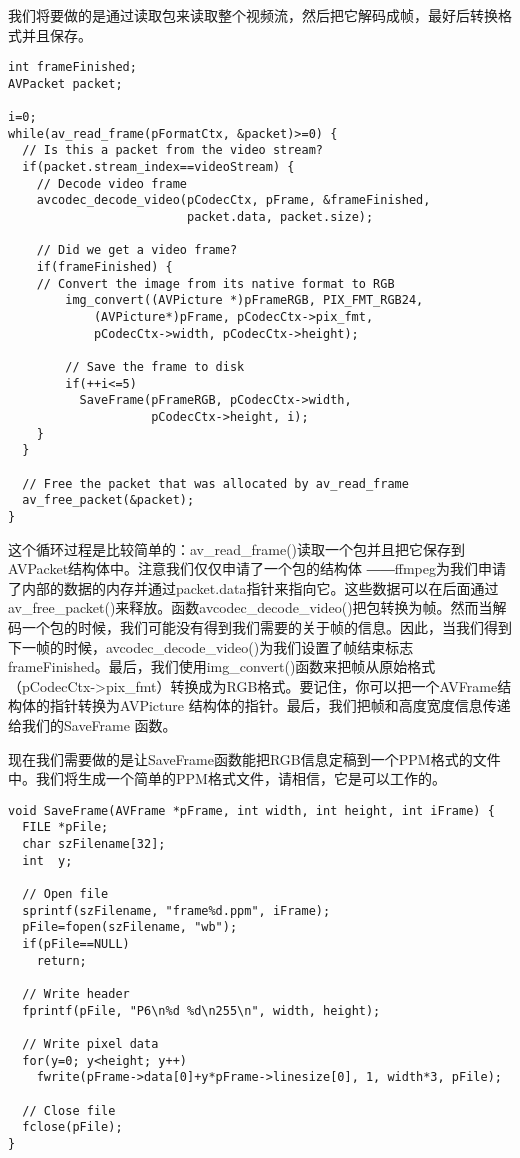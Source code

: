 我们将要做的是通过读取包来读取整个视频流，然后把它解码成帧，最好后转换格式并且保存。
\begin{lstlisting}
int frameFinished;
AVPacket packet;

i=0;
while(av_read_frame(pFormatCtx, &packet)>=0) {
  // Is this a packet from the video stream?
  if(packet.stream_index==videoStream) {
    // Decode video frame
    avcodec_decode_video(pCodecCtx, pFrame, &frameFinished,
                         packet.data, packet.size);

    // Did we get a video frame?
    if(frameFinished) {
    // Convert the image from its native format to RGB
        img_convert((AVPicture *)pFrameRGB, PIX_FMT_RGB24,
            (AVPicture*)pFrame, pCodecCtx->pix_fmt,
            pCodecCtx->width, pCodecCtx->height);

        // Save the frame to disk
        if(++i<=5)
          SaveFrame(pFrameRGB, pCodecCtx->width,
                    pCodecCtx->height, i);
    }
  }

  // Free the packet that was allocated by av_read_frame
  av_free_packet(&packet);
}
\end{lstlisting}



这个循环过程是比较简单的：av_read_frame()读取一个包并且把它保存到AVPacket结构体中。注意我们仅仅申请了一个包的结构体 ――ffmpeg为我们申请了内部的数据的内存并通过packet.data指针来指向它。这些数据可以在后面通过av_free_packet()来释放。函数avcodec_decode_video()把包转换为帧。然而当解码一个包的时候，我们可能没有得到我们需要的关于帧的信息。因此，当我们得到下一帧的时候，avcodec_decode_video()为我们设置了帧结束标志frameFinished。最后，我们使用img_convert()函数来把帧从原始格式（pCodecCtx->pix_fmt）转换成为RGB格式。要记住，你可以把一个AVFrame结构体的指针转换为AVPicture 结构体的指针。最后，我们把帧和高度宽度信息传递给我们的SaveFrame 函数。

现在我们需要做的是让SaveFrame函数能把RGB信息定稿到一个PPM格式的文件中。我们将生成一个简单的PPM格式文件，请相信，它是可以工作的。

\begin{lstlisting}
void SaveFrame(AVFrame *pFrame, int width, int height, int iFrame) {
  FILE *pFile;
  char szFilename[32];
  int  y;

  // Open file
  sprintf(szFilename, "frame%d.ppm", iFrame);
  pFile=fopen(szFilename, "wb");
  if(pFile==NULL)
    return;

  // Write header
  fprintf(pFile, "P6\n%d %d\n255\n", width, height);

  // Write pixel data
  for(y=0; y<height; y++)
    fwrite(pFrame->data[0]+y*pFrame->linesize[0], 1, width*3, pFile);

  // Close file
  fclose(pFile);
}
\end{lstlisting}

